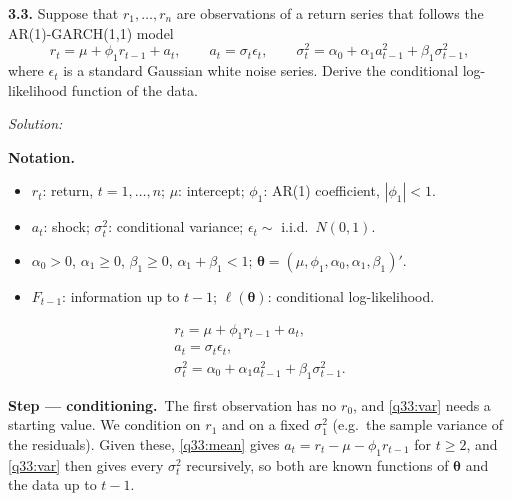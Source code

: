 \documentclass[11pt,a4paper]{article}
\newif\ifsolucoes
\newcommand{\espacoresol}{4.5cm}   %
\newenvironment{notacao}{\par\smallskip\noindent\textbf{Notation.}\begin{itemize}[leftmargin=1.4em,topsep=1pt,itemsep=0pt]\small}{\end{itemize}}
\newcommand{\resolespaco}{\ifsolucoes\else\par\textit{Solution:}\vspace{\espacoresol}\par\fi}
\newcommand{\passo}[2]{\par\smallskip\noindent\textbf{Step --- #1.}~#2}
\begin{document}
\noindent\textbf{3.3.} Suppose that $r_1,\dots,r_n$ are observations of a return series that follows the
AR(1)-GARCH(1,1) model
\[ r_t=\mu+\phi_1r_{t-1}+a_t,\qquad a_t=\sigma_t\epsilon_t,\qquad \sigma_t^2=\alpha_0+\alpha_1a_{t-1}^2+\beta_1\sigma_{t-1}^2, \]
where $\epsilon_t$ is a standard Gaussian white noise series. Derive the conditional log-likelihood function of the data.
\resolespaco
\begin{sol}
\begin{notacao}
\item $r_t$: return, $t=1,\dots,n$; $\mu$: intercept; $\phi_1$: AR(1) coefficient, $|\phi_1|<1$.
\item $a_t$: shock; $\sigma_t^2$: conditional variance; $\epsilon_t\sim$ i.i.d.\ $N(0,1)$.
\item $\alpha_0>0$, $\alpha_1\ge0$, $\beta_1\ge0$, $\alpha_1+\beta_1<1$; $\boldsymbol\theta=(\mu,\phi_1,\alpha_0,\alpha_1,\beta_1)'$.
\item $F_{t-1}$: information up to $t-1$; $\ell(\boldsymbol\theta)$: conditional log-likelihood.
\end{notacao}
\begin{gather}
r_t=\mu+\phi_1r_{t-1}+a_t, \label{q33:mean}\\
a_t=\sigma_t\epsilon_t, \label{q33:a}\\
\sigma_t^2=\alpha_0+\alpha_1a_{t-1}^2+\beta_1\sigma_{t-1}^2. \label{q33:var}
\end{gather}

\passo{conditioning}{The first observation has no $r_0$, and \eqref{q33:var} needs a starting value.
We condition on $r_1$ and on a fixed $\sigma_1^2$ (e.g.\ the sample variance of the residuals). Given these,
\eqref{q33:mean} gives $a_t=r_t-\mu-\phi_1r_{t-1}$ for $t\ge2$, and \eqref{q33:var} then gives every $\sigma_t^2$
recursively, so both are known functions of $\boldsymbol\theta$ and the data up to $t-1$.}


\end{sol}
\end{document}
